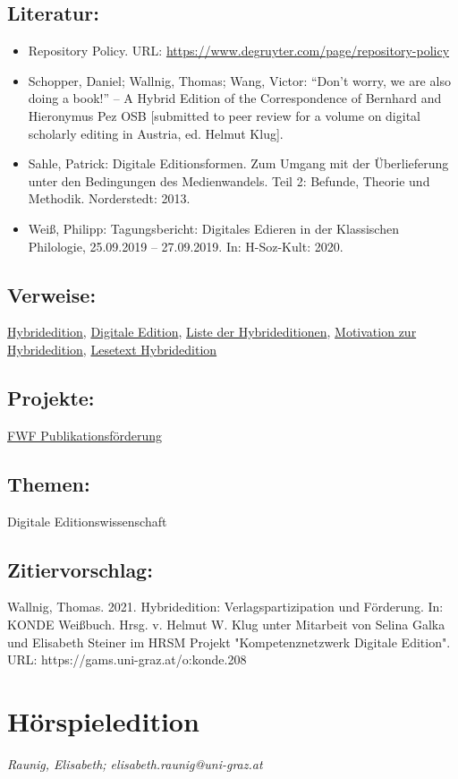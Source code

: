 \documentclass{article}
\begin{document}
        \subsection*{Literatur:}\begin{itemize}\item Repository Policy. URL: \url{https://www.degruyter.com/page/repository-policy}\item Schopper, Daniel; Wallnig, Thomas; Wang, Victor: “Don’t worry, we are also doing a book!” – A Hybrid Edition of the
                              Correspondence of Bernhard and Hieronymus Pez OSB [submitted to peer review for a
                              volume on digital scholarly editing in Austria, ed. Helmut Klug].\item Sahle, Patrick: Digitale Editionsformen. Zum Umgang mit der Überlieferung unter den Bedingungen des Medienwandels. Teil 2: Befunde, Theorie und Methodik. Norderstedt: 2013.\item Weiß, Philipp: Tagungsbericht: Digitales Edieren in der Klassischen Philologie, 25.09.2019 – 27.09.2019. In: H-Soz-Kult: 2020.\end{itemize}\subsection*{Verweise:}\href{https://gams.uni-graz.at/o:konde.96}{Hybridedition}, \href{https://gams.uni-graz.at/o:konde.59}{Digitale Edition}, \href{https://gams.uni-graz.at/o:konde.117}{Liste der Hybrideditionen}, \href{https://gams.uni-graz.at/o:konde.138}{Motivation zur Hybridedition}, \href{https://gams.uni-graz.at/o:konde.22}{Lesetext Hybridedition}\subsection*{Projekte:}\href{https://www.fwf.ac.at/de/forschungsfoerderung/fwf-programme/selbststaendige-publikationen}{FWF Publikationsförderung}\subsection*{Themen:}Digitale Editionswissenschaft\subsection*{Zitiervorschlag:}Wallnig, Thomas. 2021. Hybridedition: Verlagspartizipation und Förderung. In: KONDE Weißbuch. Hrsg. v. Helmut W. Klug unter Mitarbeit von Selina Galka und Elisabeth Steiner im HRSM Projekt "Kompetenznetzwerk Digitale Edition". URL: https://gams.uni-graz.at/o:konde.208\newpage\section*{Hörspieledition} \emph{Raunig, Elisabeth; elisabeth.raunig@uni-graz.at}\\
        
\end{document}
